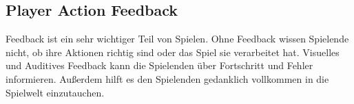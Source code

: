 \subsection{Player Action Feedback\label{_feedback}}

Feedback ist ein sehr wichtiger Teil von Spielen. Ohne Feedback wissen Spielende nicht, ob ihre Aktionen richtig sind oder das Spiel sie verarbeitet hat. Visuelles und Auditives Feedback kann die Spielenden über Fortschritt und Fehler informieren. Außerdem hilft es den Spielenden gedanklich vollkommen in die Spielwelt einzutauchen.